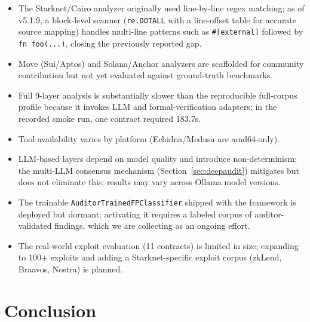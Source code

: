 \documentclass[conference]{IEEEtran}
\begin{document}
\begin{itemize}
    \item The Starknet/Cairo analyzer originally used line-by-line regex matching; as of v5.1.9, a block-level scanner (\texttt{re.DOTALL} with a line-offset table for accurate source mapping) handles multi-line patterns such as \texttt{\#[external]} followed by \texttt{fn foo(...)}, closing the previously reported gap.
    \item Move (Sui/Aptos) and Solana/Anchor analyzers are scaffolded for community contribution but not yet evaluated against ground-truth benchmarks.
    \item Full 9-layer analysis is substantially slower than the reproducible full-corpus profile because it invokes LLM and formal-verification adapters; in the recorded smoke run, one contract required 183.7s.
    \item Tool availability varies by platform (Echidna/Medusa are amd64-only).
    \item LLM-based layers depend on model quality and introduce non-determinism; the multi-LLM consensus mechanism (Section~\ref{sec:deepaudit}) mitigates but does not eliminate this; results may vary across Ollama model versions.
    \item The trainable \texttt{AuditorTrainedFPClassifier} shipped with the framework is deployed but dormant: activating it requires a labeled corpus of auditor-validated findings, which we are collecting as an ongoing effort.
    \item The real-world exploit evaluation (11 contracts) is limited in size; expanding to 100+ exploits and adding a Starknet-specific exploit corpus (zkLend, Braavos, Nostra) is planned.
\end{itemize}

\section{Conclusion}
\end{document}
